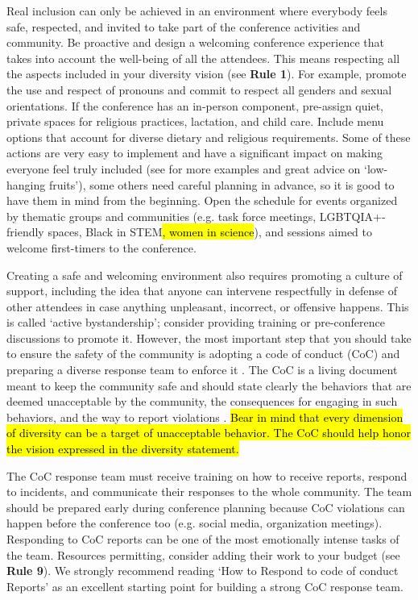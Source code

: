 \documentclass[10pt,letterpaper]{article}
\begin{document}
Real inclusion can only be achieved in an environment where everybody feels safe, respected, and invited to take part of the conference activities and community. Be proactive and design a welcoming conference experience that takes into account the well-being of all the attendees. This means respecting all the aspects included in your diversity vision (see \textbf{Rule 1}). For example, promote the use and respect of pronouns and commit to respect all genders and sexual orientations. If the conference has an in-person component, pre-assign quiet, private spaces for religious practices, lactation, and child care. Include menu options that account for diverse dietary and religious requirements.
Some of these actions are very easy to implement and have a significant impact on making everyone feel truly included (see \cite{numfocus_discover_2021} for more examples and great advice on `low-hanging fruits'), some others need careful planning in advance, so it is good to have them in mind from the beginning.
Open the schedule for events organized by thematic groups and communities (e.g. task force meetings, LGBTQIA+-friendly spaces, Black in STEM\hl{, women in science}), and sessions aimed to welcome first-timers to the conference.

Creating a safe and welcoming environment also requires promoting a culture of support, including the idea that anyone can intervene respectfully in defense of other attendees in case anything unpleasant, incorrect, or offensive happens.
This is called `active bystandership'; consider providing training or pre-conference discussions to promote it.
However, the most important step that you should take to ensure the safety of the community is
adopting a code of conduct (CoC) and preparing a diverse response team to enforce it \cite{favaroYourScienceConference2016}.
The CoC is a living document meant to keep the community safe and should state clearly the behaviors that are deemed unacceptable by the community, the consequences for engaging in such behaviors, and the way to report violations \cite{auroraHowRespondCode2019}. 
\hl{Bear in mind that every dimension of diversity can be a target of unacceptable behavior. The CoC should help honor the vision expressed in the diversity statement.} 
 

The CoC response team must receive training on how to receive reports, respond to incidents, and communicate their responses to the whole community. The team should be prepared early during conference planning because CoC violations can happen before the conference too (e.g. social media, organization meetings).  
Responding to CoC reports can be one of the most emotionally intense tasks of the team. Resources permitting, consider adding their work to your budget (see \textbf{Rule 9}).
We strongly recommend reading `How to Respond to code of conduct Reports' \cite{auroraHowRespondCode2019} as an excellent starting point for building a strong CoC response team. 
 
\end{document}
